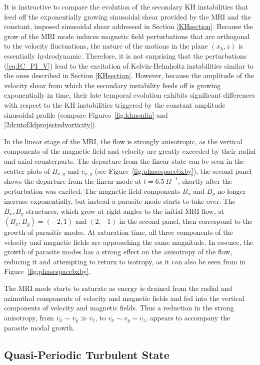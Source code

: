 \documentclass[]{emulateapj}
\begin{document}
It is instructive to compare the evolution of the secondary KH instabilities
that feed off the exponentially growing sinusoidal shear provided by the MRI and the
constant, imposed sinusoidal shear addressed in Section \ref{KHsection}.
Because the grow of the MRI mode induces magnetic field perturbations that are 
orthogonal to the velocity fluctuations, the nature of the motions in the plane
$(x_h,z)$ is essentially hydrodynamic. Therefore, it is not surprising that the
perturbations (\ref{eq:IC_PI_V}) lead to the excitation of
Kelvin-Helmholtz instabilities similar to the ones described in
Section \ref{KHsection}. However, because the amplitude of the
velocity shear from which the secondary instability feeds off is
growing exponentially in time, their late temporal evolution exhibits
significant differences with respect to the KH instabilities triggered
by the constant amplitude sinusoidal profile (compare
Figures~\ref{fig:khnonlin} and \ref{2dcutof3dprojectedvorticity}).

In the linear stage of the MRI, the flow is strongly anisotropic, as the vertical
components of the magnetic field and velocity are greatly
exceeded by their radial and axial counterparts.  
The departure from the linear state can be seen in the scatter plots 
of $B_{x,y}$ and $v_{x,y}$ (see Figure~\ref{fig:phasespacebxby}), the second panel shows the
departure from the linear mode at $t=6.5 ~\Omega^{-1}$, shortly after the
perturbation was excited.  The magnetic field components $B_x$ and $B_y$ no longer increase
exponentially, but instead a parasite mode starts to take over. 
The $B_x, B_y$ structures, which grow
at right angles to the initial MRI flow, at $(B_x,B_y)=(-2,1)$ and
$(2,-1)$ in the second panel, then correspond to the growth of
parasitic modes.  
At saturation time,
all three components of the velocity and magnetic fields are
approaching the same magnitude.  In essence, the growth of parasite 
modes has a strong effect on the anisotropy of the flow, reducing it and 
attempting to return to isotropy, as it can also be seen from 
in Figure~\ref{fig:phasespacebxby}.


The MRI mode starts to saturate as energy is drained from the radial
and azimuthal components of velocity and magnetic fields and fed into
the vertical components of velocity and magnetic fields.  Thus a
reduction in the strong anisotropy, from $v_x \sim v_y \gg v_z$, to
$v_x \sim v_y \sim v_z$, appears to accompany the parasite modal growth.




\subsection{Quasi-Periodic Turbulent State}
\end{document}

